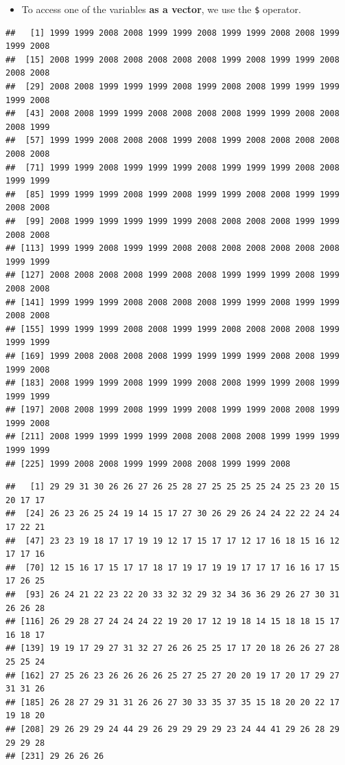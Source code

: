 \documentclass[]{book}
\newenvironment{Shaded}{\begin{snugshade}}{\end{snugshade}}
\newcommand{\OperatorTok}[1]{\textcolor[rgb]{0.81,0.36,0.00}{\textbf{#1}}}
\newcommand{\NormalTok}[1]{#1}
\providecommand{\tightlist}{%
  \setlength{\itemsep}{0pt}\setlength{\parskip}{0pt}}
\begin{document}
\begin{itemize}
\tightlist
\item
  To access one of the variables \textbf{as a vector}, we use the
  \texttt{\$} operator.
\end{itemize}

\begin{Shaded}
\end{Shaded}

\begin{verbatim}
##   [1] 1999 1999 2008 2008 1999 1999 2008 1999 1999 2008 2008 1999 1999 2008
##  [15] 2008 1999 2008 2008 2008 2008 2008 1999 2008 1999 1999 2008 2008 2008
##  [29] 2008 2008 1999 1999 1999 2008 1999 2008 2008 1999 1999 1999 1999 2008
##  [43] 2008 2008 1999 1999 2008 2008 2008 2008 1999 1999 2008 2008 2008 1999
##  [57] 1999 1999 2008 2008 2008 1999 2008 1999 2008 2008 2008 2008 2008 2008
##  [71] 1999 1999 2008 1999 1999 1999 2008 1999 1999 1999 2008 2008 1999 1999
##  [85] 1999 1999 1999 2008 1999 2008 1999 1999 2008 2008 1999 1999 2008 2008
##  [99] 2008 1999 1999 1999 1999 1999 2008 2008 2008 2008 1999 1999 2008 2008
## [113] 1999 1999 2008 1999 1999 2008 2008 2008 2008 2008 2008 2008 1999 1999
## [127] 2008 2008 2008 2008 1999 2008 2008 1999 1999 1999 2008 1999 2008 2008
## [141] 1999 1999 1999 2008 2008 2008 2008 1999 1999 2008 1999 1999 2008 2008
## [155] 1999 1999 1999 2008 2008 1999 1999 2008 2008 2008 2008 1999 1999 1999
## [169] 1999 2008 2008 2008 2008 1999 1999 1999 1999 2008 2008 1999 1999 2008
## [183] 2008 1999 1999 2008 1999 1999 2008 2008 1999 1999 2008 1999 1999 1999
## [197] 2008 2008 1999 2008 1999 1999 2008 1999 1999 2008 2008 1999 1999 2008
## [211] 2008 1999 1999 1999 1999 2008 2008 2008 2008 1999 1999 1999 1999 1999
## [225] 1999 2008 2008 1999 1999 2008 2008 1999 1999 2008
\end{verbatim}

\begin{Shaded}
\end{Shaded}

\begin{verbatim}
##   [1] 29 29 31 30 26 26 27 26 25 28 27 25 25 25 25 24 25 23 20 15 20 17 17
##  [24] 26 23 26 25 24 19 14 15 17 27 30 26 29 26 24 24 22 22 24 24 17 22 21
##  [47] 23 23 19 18 17 17 19 19 12 17 15 17 17 12 17 16 18 15 16 12 17 17 16
##  [70] 12 15 16 17 15 17 17 18 17 19 17 19 19 17 17 17 16 16 17 15 17 26 25
##  [93] 26 24 21 22 23 22 20 33 32 32 29 32 34 36 36 29 26 27 30 31 26 26 28
## [116] 26 29 28 27 24 24 24 22 19 20 17 12 19 18 14 15 18 18 15 17 16 18 17
## [139] 19 19 17 29 27 31 32 27 26 26 25 25 17 17 20 18 26 26 27 28 25 25 24
## [162] 27 25 26 23 26 26 26 26 25 27 25 27 20 20 19 17 20 17 29 27 31 31 26
## [185] 26 28 27 29 31 31 26 26 27 30 33 35 37 35 15 18 20 20 22 17 19 18 20
## [208] 29 26 29 29 24 44 29 26 29 29 29 29 23 24 44 41 29 26 28 29 29 29 28
## [231] 29 26 26 26
\end{verbatim}
\end{document}
